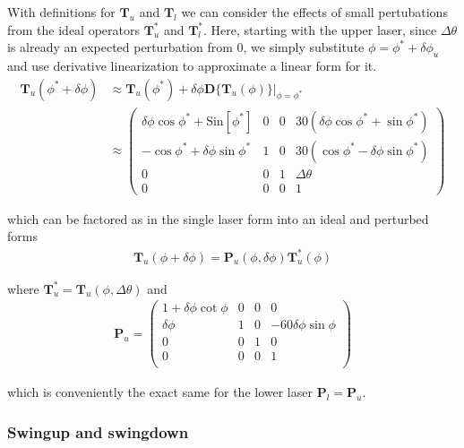 With definitions for $\mathbf{T}_{u}$ and $\mathbf{T}_{l}$ we can
consider the effects of small pertubations from the ideal operators
$\mathbf{T}_{u}^{*}$ and $\mathbf{T}_{l}^{*}$. Here, starting with the
upper laser, since $\Delta\theta$ is already an expected perturbation
from 0, we simply substitute $\phi = \phi^{*} + \delta\phi_{u}$ and
use derivative linearization to approximate a linear form for it.
\begin{align}
  \mathbf{T}_{u}(\phi^{*}+\delta\phi) &\approx
  \mathbf{T}_{u}(\phi^{*}) + \delta\phi
  \mathbf{D}\{\mathbf{T}_{u}(\phi)\}|_{\phi = \phi^{*}} \\
  &\approx
  \left(
    \begin{array}{cccc}
      \delta\phi \cos\phi^{*}+\text{Sin}[\phi^{*} ] & 0 & 0 & 30 (\delta
      \phi \cos\phi^{*} + \sin\phi^{*}) \\
      -\cos\phi^{*} + \delta\phi \sin\phi^{*} & 1 & 0 & 30
      (\cos\phi^{*} - \delta\phi \sin\phi^{*}) \\
      0 & 0 & 1 & \Delta \theta  \\
      0 & 0 & 0 & 1
    \end{array}
  \right)
\end{align}

which can be factored as in the single laser form into an ideal and
perturbed forms
\begin{align}
  \mathbf{T}_{u}(\phi + \delta\phi) = \mathbf{P}_{u}(\phi, \delta\phi)\mathbf{T}_{u}^{*}(\phi)
\end{align}

where $\mathbf{T}_{u}^{*} = \mathbf{T}_{u}(\phi, \Delta\theta)$ and
\begin{align}
  \mathbf{P}_{u} = \left(
    \begin{array}{cccc}
      1 + \delta\phi \cot\phi & 0 & 0 & 0 \\
      \delta\phi & 1 & 0 & -60 \delta\phi \sin\phi \\
      0 & 0 & 1 & 0 \\
      0 & 0 & 0 & 1 \\
    \end{array}
  \right)
\end{align}

which is conveniently the exact same for the lower laser
$\mathbf{P}_{l} = \mathbf{P}_{u}$.

\subsubsection{Swingup and swingdown}
\label{sec:swingup-swingdown}

